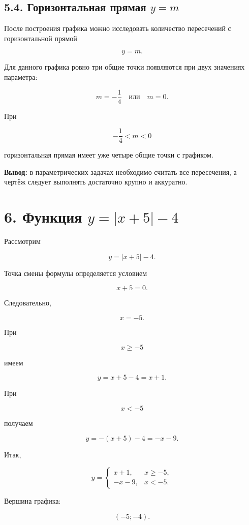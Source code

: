 \documentclass[a4paper,12pt]{article}
\newcommand{\important}[1]{\textcolor{darkaccent}{\textbf{#1}}}
\begin{document}
\subsection*{5.4. Горизонтальная прямая \(y=m\)}

После построения графика можно исследовать количество
пересечений с горизонтальной прямой

\[
y=m.
\]

Для данного графика ровно три общие точки появляются
при двух значениях параметра:

\[
\boxed{
m=-\frac14
\quad\text{или}\quad
m=0
}.
\]

При

\[
-\frac14<m<0
\]

горизонтальная прямая имеет уже четыре общие точки с графиком.

\important{Вывод:}
в параметрических задачах необходимо считать все пересечения,
а чертёж следует выполнять достаточно крупно и аккуратно.


\section*{\textcolor{darkaccent}{
6. Функция \(y=|x+5|-4\)
}}

Рассмотрим

\[
y=|x+5|-4.
\]

Точка смены формулы определяется условием

\[
x+5=0.
\]

Следовательно,

\[
x=-5.
\]

При

\[
x\ge-5
\]

имеем

\[
y=x+5-4=x+1.
\]

При

\[
x<-5
\]

получаем

\[
y=-(x+5)-4=-x-9.
\]

Итак,

\[
\boxed{
y=
\begin{cases}
x+1, & x\ge-5,\\
-x-9, & x<-5.
\end{cases}
}
\]

Вершина графика:

\[
\boxed{(-5;-4)}.
\]
\end{document}
